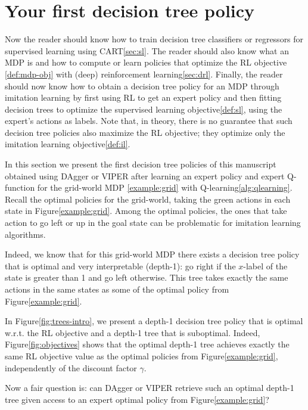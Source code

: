 \section{Your first decision tree policy}
Now the reader should know how to train decision tree classifiers or regressors for supervised learning using CART\ref{sec:sl}.
The reader should also know what an MDP is and how to compute or learn policies that optimize the RL objective \ref{def:mdp-obj} with (deep) reinforcement learning\ref{sec:drl}.
Finally, the reader should now know how to obtain a decision tree policy for an MDP through imitation learning by first using RL to get an expert policy and then fitting decision trees to optimize the supervised learning objective\ref{def:sl}, using the expert's actions as labels.
Note that, in theory, there is no guarantee that such decision tree policies also maximize the RL objective; they optimize only the imitation learning objective\ref{def:il}.

In this section we present the first decision tree policies of this manuscript obtained using DAgger or VIPER after learning an expert policy and expert Q-function for the grid-world MDP \ref{example:grid} with Q-learning\ref{alg:qlearning}.
Recall the optimal policies for the grid-world, taking the green actions in each state in Figure\ref{example:grid}. 
Among the optimal policies, the ones that take action to go left or up in the goal state can be problematic for imitation learning algorithms.

Indeed, we know that for this grid-world MDP there exists a decision tree policy that is optimal and very interpretable (depth-1): go right if the $x$-label of the state is greater than 1 and go left otherwise.
This tree takes exactly the same actions in the same states as some of the optimal policy from Figure\ref{example:grid}.

In Figure\ref{fig:trees-intro}, we present a depth-1 decision tree policy that is optimal w.r.t. the RL objective and a depth-1 tree that is suboptimal.
Indeed, Figure\ref{fig:objectives} shows that the optimal depth-1 tree achieves exactly the same RL objective value as the optimal policies from Figure\ref{example:grid}, independently of the discount factor $\gamma$.

Now a fair question is: can DAgger or VIPER retrieve such an optimal depth-1 tree given access to an expert optimal policy from Figure\ref{example:grid}?

